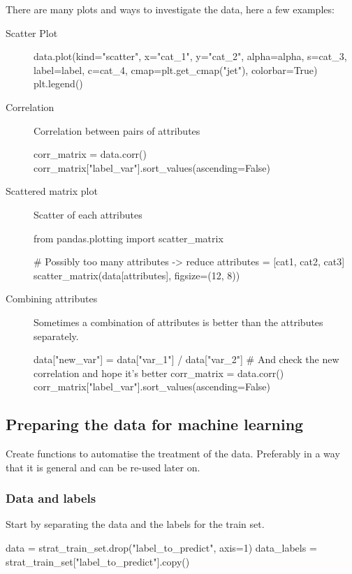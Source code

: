 \documentclass{article}
\begin{document}
There are many plots and ways to investigate the data, here a few examples:
\begin{description}
  \item [Scatter Plot] \hfill
  \begin{python}
    data.plot(kind="scatter", x="cat_1", y="cat_2", alpha=alpha,
          s=cat_3, label=label, c=cat_4, cmap=plt.get_cmap("jet"),
          colorbar=True)
          plt.legend()
        \end{python}

  \item [Correlation] Correlation between pairs of attributes \hfill
    \begin{python}
      corr_matrix = data.corr()
      corr_matrix["label_var"].sort_values(ascending=False)
    \end{python}

  \item [Scattered matrix plot] Scatter of each attributes \hfill
    \begin{python}
      from pandas.plotting import scatter_matrix

      # Possibly too many attributes -> reduce
      attributes = [cat1, cat2, cat3]
      scatter_matrix(data[attributes], figsize=(12, 8))
    \end{python}

  \item [Combining attributes] Sometimes a combination of attributes is better than the attributes separately. \hfill
    \begin{python}
      data["new_var"] = data["var_1"] / data["var_2"]
      # And check the new correlation and hope it's better
      corr_matrix = data.corr()
      corr_matrix["label_var"].sort_values(ascending=False)
    \end{python}
\end{description}

\subsection{Preparing the data for machine learning}
Create functions to automatise the treatment of the data.
Preferably in a way that it is general and can be re-used later on.

    \subsubsection*{Data and labels}
      Start by separating the data and the labels for the train set.
      \begin{python}
        data = strat_train_set.drop("label_to_predict", axis=1)
        data_labels = strat_train_set["label_to_predict"].copy()
      \end{python}
\end{document}
